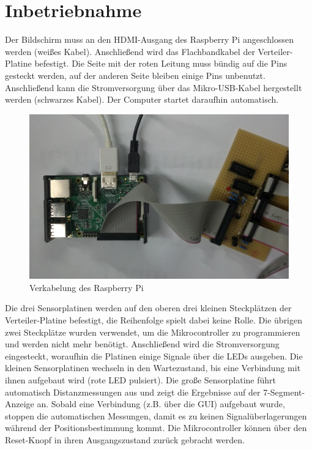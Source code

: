 
\chapter{Inbetriebnahme}

Der Bildschirm muss an den HDMI-Ausgang des Raspberry Pi angeschlossen werden (weißes Kabel). Anschließend wird das Flachbandkabel der Verteiler-Platine befestigt. Die Seite mit der roten Leitung muss bündig auf die Pins gesteckt werden, auf der anderen Seite bleiben einige Pins unbenutzt. Anschließend kann die Stromversorgung über das Mikro-USB-Kabel hergestellt werden (schwarzes Kabel). Der Computer startet daraufhin automatisch.\\
\begin{figure}[H]
	\centering
	\includegraphics[width=(\textwidth), angle=0]{fotos/rasp.jpg}
	\caption{Verkabelung des Raspberry Pi} \label{p:1}
\end{figure}
Die drei Sensorplatinen werden auf den oberen drei kleinen Steckplätzen der Verteiler-Platine befestigt, die Reihenfolge spielt dabei keine Rolle. Die übrigen zwei Steckplätze wurden verwendet, um die Mikrocontroller zu programmieren und werden nicht mehr benötigt. Anschließend wird die Stromversorgung eingesteckt, woraufhin die Platinen einige Signale über die LEDs ausgeben. Die kleinen Sensorplatinen wechseln in den Wartezustand, bis eine Verbindung mit ihnen aufgebaut wird (rote LED pulsiert). Die große Sensorplatine führt automatisch Distanzmessungen aus und zeigt die Ergebnisse auf der 7-Segment-Anzeige an. Sobald eine Verbindung (z.B. über die GUI) aufgebaut wurde, stoppen die automatischen Messungen, damit es zu keinen Signalüberlagerungen während der Positionsbestimmung kommt. Die Mikrocontroller können über den Reset-Knopf in ihren Ausgangszustand zurück gebracht werden.\\
